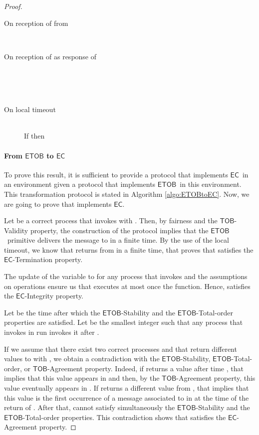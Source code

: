 \documentclass[11pt]{article}
\newcommand{\EC}{\ensuremath{\mathsf{EC}}}
\newcommand{\ETOB}{\ensuremath{\mathsf{ETOB}}}
\newcommand{\TOB}{\ensuremath{\mathsf{TOB}}}
\begin{document}
\begin{proof}
\begin{algorithm}
\begin{description}
\item[On reception of  from ]~\\


\item[On reception of  as response of ]~\\
\\
\\


\item[On local timeout]~\\
If  then\\


\end{description}
\normalsize
\end{algorithm}

\paragraph{From {\ETOB} to {\EC}} To prove this result, it is sufficient to provide a protocol that
implements \EC~in an environment  given a protocol that
implements \ETOB~in this environment. This transformation protocol
 is stated  in Algorithm
\ref{algo:ETOBtoEC}. Now, we are going to prove that  implements \EC.

Let  be a correct process that invokes  with . Then, by fairness and the \TOB-Validity property, the construction of the protocol implies that the \ETOB~primitive delivers the message  to  in a finite time. By the use of the local timeout, we know that  returns from  in a finite time, that proves that  satisfies the \EC-Termination property.

The update of the variable  to  for any process  that invokes  and the assumptions on operations  ensure us that  executes at most once the function\linebreak . Hence,  satisfies the \EC-Integrity property.

Let  be the time after which the \ETOB-Stability and the \ETOB-Total-order properties are satisfied. Let  be the smallest integer such that any process that invokes  in run  invokes it after .

If we assume that there exist two correct processes  and  that return different values to  with , we obtain a contradiction with the \ETOB-Stability, \ETOB-Total-order, or \TOB-Agreement property. Indeed, if  returns a value after time , that implies that this value appears in  and then, by the \TOB-Agreement property, this value eventually appears in . If  returns a different value from , that implies that this value is the first occurrence of a message associated to  in  at the time of the return of . After that,  cannot satisfy simultaneously the \ETOB-Stability and the \ETOB-Total-order properties. This contradiction shows that  satisfies the \EC-Agreement property.


\end{proof}
\end{document}
